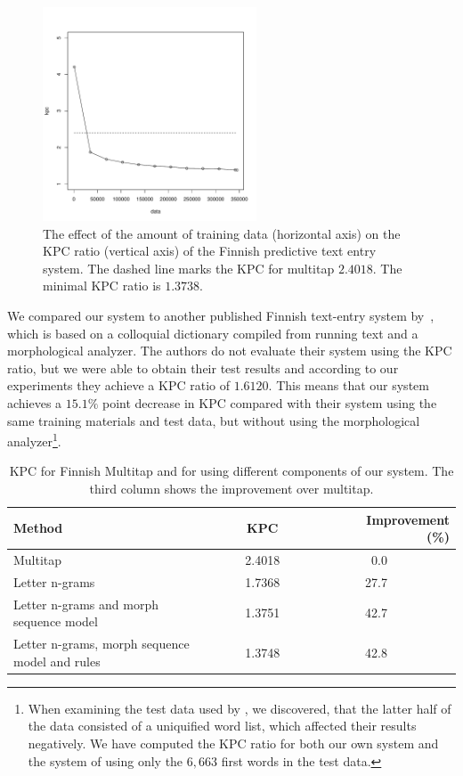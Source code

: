 \documentclass{llncs}
\begin{document}
\begin{figure}[hbt!]
\begin{center}
\includegraphics[width=2.5in]{finnish_kpc_figure.pdf}
\end{center}
\caption{The effect of the amount of training data (horizontal axis)
  on the KPC ratio (vertical axis) of the Finnish predictive text
  entry system. The dashed line marks the KPC for
  multitap $2.4018$. The minimal KPC ratio is $1.3738$.}\label{fi-kpc-graph}
\end{figure}

We compared our system to another published Finnish text-entry system
by~\cite{silfverberg/2011/cla}, which is based on a colloquial
dictionary compiled from running text and a morphological
analyzer. The authors do not evaluate their system using the KPC
ratio, but we were able to obtain their test results and according to
our experiments they achieve a KPC ratio of $1.6120$. This means that
our system achieves a $15.1\%$ point decrease in KPC compared with
their system using the same training materials and test data, but
without using the morphological analyzer\footnote{When examining the
  test data used by \cite{silfverberg/2011/cla}, we discovered, that
  the latter half of the data consisted of a uniquified word list,
  which affected their results negatively. We have computed the KPC
  ratio for both our own system and the system of
  \cite{silfverberg/2011/cla} using only the $6,663$ first words in
  the test data.}.

\begin{table}
\begin{center}
\caption{KPC for Finnish Multitap and for using different components of
  our system. The third column shows the improvement over
  multitap.}\label{Finnish-kpc-table}
\begin{tabular}{lcr}
\hline
Method ~~~~& ~~~~KPC~~~~ &~~~~Improvement (\%)\\
\hline
Multitap                                       &2.4018 & 0.0~~~~~~~~~~\\
Letter n-grams                                 &1.7368 & 27.7~~~~~~~~~~\\
Letter n-grams and morph sequence model        &1.3751 & 42.7~~~~~~~~~~\\
Letter n-grams, morph sequence model and rules &1.3748 & 42.8~~~~~~~~~~\\
\hline
\end{tabular}
\end{center}
\end{table}
\end{document}
